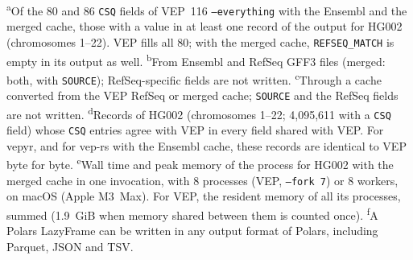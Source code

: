 \textsuperscript{a}Of the 80 and 86 \texttt{CSQ} fields of VEP~116 \texttt{--everything} with the Ensembl and the merged cache, those with a value in at least one record of the output for HG002 (chromosomes 1--22). VEP fills all 80; with the merged cache, \texttt{REFSEQ\_MATCH} is empty in its output as well. \textsuperscript{b}From Ensembl and RefSeq GFF3 files (merged: both, with \texttt{SOURCE}); RefSeq-specific fields are not written. \textsuperscript{c}Through a cache converted from the VEP RefSeq or merged cache; \texttt{SOURCE} and the RefSeq fields are not written. \textsuperscript{d}Records of HG002 (chromosomes 1--22; 4,095,611 with a \texttt{CSQ} field) whose \texttt{CSQ} entries agree with VEP in every field shared with VEP. For vepyr, and for vep-rs with the Ensembl cache, these records are identical to VEP byte for byte. \textsuperscript{e}Wall time and peak memory of the process for HG002 with the merged cache in one invocation, with 8 processes (VEP, \texttt{--fork 7}) or 8 workers, on macOS (Apple M3~Max). For VEP, the resident memory of all its processes, summed (1.9~GiB when memory shared between them is counted once). \textsuperscript{f}A Polars LazyFrame can be written in any output format of Polars, including Parquet, JSON and TSV.
